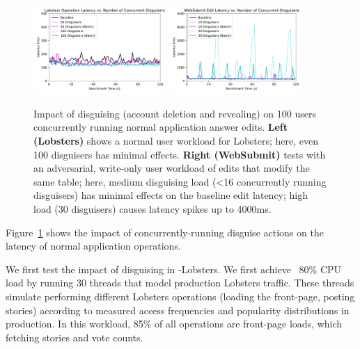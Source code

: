 
\begin{figure}[t!]
    \centering
        \includegraphics[width=0.45\textwidth]{figs/lobsters_concurrent_results}
        \includegraphics[width=0.45\textwidth]{figs/websubmit_concurrent_results_20lec_100users}
    \caption{Impact of disguising (account deletion and revealing) on 100 users concurrently running
    normal application answer edits. 
    \textbf{Left (Lobsters)} shows a normal user workload for Lobsters; here, even 100 disguisers
    has minimal effects.
    \textbf{Right (WebSubmit)} tests with an adversarial,
    write-only user workload of edits that modify the same table; here, medium disguising load (<16
    concurrently running disguisers) has minimal effects on the baseline edit latency; high load (30
    disguisers) causes latency spikes up to 4000ms.
    } 
    \label{fig:concurrent}
\end{figure}

Figure~\ref{fig:concurrent} shows the impact of concurrently-running disguise actions on the latency
of normal application operations.

We first test the impact of disguising in \sys-Lobsters. We first achieve ~80\% CPU load by running
30 threads that model production Lobsters traffic. These threads simulate performing different
Lobsters operations (\eg loading the front-page, posting stories) according to measured access
frequencies and popularity distributions in production. In this workload, 85\% of all
operations are front-page loads, which fetching stories and vote counts.

